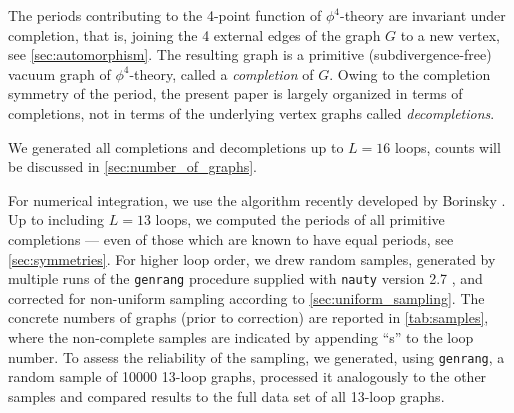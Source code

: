 \documentclass[12pt,a4paper]{article}
\renewcommand{\|}{\rule[-0.4ex]{0.2ex}{1.2em}}
\begin{document}
	The periods contributing to the 4-point function of $\phi^4$-theory   are invariant under  completion, that is, joining the 4 external edges of the graph $G$ to a new vertex, see \cref{sec:automorphism}. The resulting graph is a primitive (subdivergence-free)  vacuum graph  of $\phi^4$-theory, called a \emph{completion} of $G$. Owing to the completion symmetry of the period, the present paper is largely organized in terms of completions, not in terms of the underlying vertex graphs called \emph{decompletions}.
	
	We generated all completions and decompletions up to $L=16$ loops, counts will be discussed in \cref{sec:number_of_graphs}. 

	For numerical integration, we use the algorithm recently developed by Borinsky \cite{borinsky_tropical_2023a}.
	Up to including $L=13$ loops, we computed the periods of all primitive completions --- even of  those which are known to have equal periods, see \cref{sec:symmetries}. For higher loop order, we drew   random samples, generated by multiple runs of the \texttt{genrang} procedure supplied with \texttt{nauty} version 2.7 \cite{mckay_practical_2014}, and corrected for non-uniform sampling according to  \cref{sec:uniform_sampling}. The concrete numbers of graphs (prior to correction) are reported in \cref{tab:samples}, where the non-complete samples are indicated by appending \enquote{s} to the loop number. 
	To assess the reliability of the sampling, we generated, using \texttt{genrang}, a random sample of 10000 13-loop graphs, processed it analogously to the other samples and compared results to the full data set of all 13-loop graphs. 
	
\end{document}
